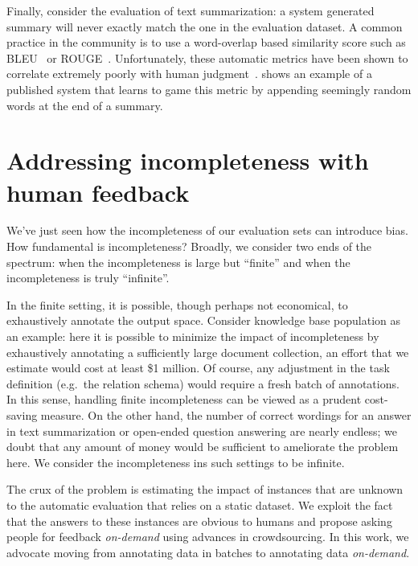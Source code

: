 Finally, consider the evaluation of text summarization: a system generated summary will never exactly match the one in the evaluation dataset.
A common practice in the community is to use a word-overlap based similarity score such as BLEU~\citep{papineni02bleu} or ROUGE~\citep{lin2004rouge}\@.
Unfortunately, these automatic metrics have been shown to correlate extremely poorly with human judgment~\citep{novikova2017why}.
 shows an example of a published system that learns to game this metric by appending seemingly random words at the end of a summary.

\section{Addressing incompleteness with human feedback}
We've just seen how the incompleteness of our evaluation sets can introduce bias.
How fundamental is incompleteness?
Broadly, we consider two ends of the spectrum: when the incompleteness is large but ``finite'' and when the incompleteness is truly ``infinite''.

In the finite setting, it is possible, though perhaps not economical, to exhaustively annotate the output space.
Consider knowledge base population as an example: here it is possible to minimize the impact of incompleteness by exhaustively annotating a sufficiently large document collection, an effort that we estimate would cost at least \$1 million.
Of course, any adjustment in the task definition (e.g.\ the relation schema) would require a fresh batch of annotations.
In this sense, handling finite incompleteness can be viewed as a prudent cost-saving measure.
On the other hand, the number of correct wordings for an answer in text summarization or open-ended question answering are nearly endless; we doubt that any amount of money would be sufficient to ameliorate the problem here.
We consider the incompleteness ins such settings to be infinite. 

The crux of the problem is estimating the impact of instances that are unknown to the automatic evaluation that relies on a static dataset.
We exploit the fact that the answers to these instances are obvious to humans and propose asking people for feedback \textit{on-demand} using advances in crowdsourcing.
In this work, we advocate moving from annotating data in batches to annotating data \textit{on-demand}.

